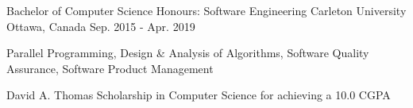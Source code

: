 
\begin{cventries}
	\cventry
		{Bachelor of Computer Science Honours: Software Engineering}
		{Carleton University}
		{Ottawa, Canada}
		{Sep. 2015 - Apr. 2019}
		{\begin{cvitems}
			\item Parallel Programming, Design \& Analysis of Algorithms, Software Quality Assurance, Software Product Management
			\item David A. Thomas Scholarship in Computer Science for achieving a 10.0 CGPA
		\end{cvitems}}
\end{cventries}